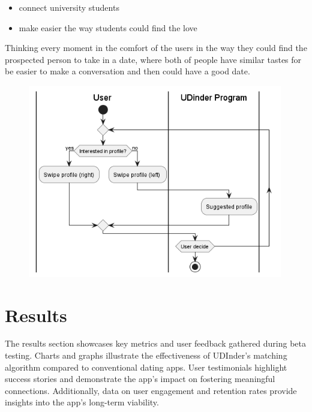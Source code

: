 \documentclass[final]{beamer}
\begin{document}
\begin{poster}
\begin{itemize}
  \item connect university students
  \item make easier the way students could find the love
\end{itemize}

Thinking every moment in the comfort of the users in the way they could find the prospected person to take in a date, where both of people have similar tastes for be easier to make a conversation and then could have a good date.

\begin{figure}
    \centering
    \includegraphics[width=0.99\textwidth]{flames/swipe_funtion_AD.png}
    \caption{\sffamily                }
\end{figure}



\newcolumn
\section{Results}
\justifying
The results section showcases key metrics and user feedback gathered during beta testing. Charts and graphs illustrate the effectiveness of UDInder's matching algorithm compared to conventional dating apps. User testimonials highlight success stories and demonstrate the app's impact on fostering meaningful connections. Additionally, data on user engagement and retention rates provide insights into the app's long-term viability.



\end{poster}
\end{document}
